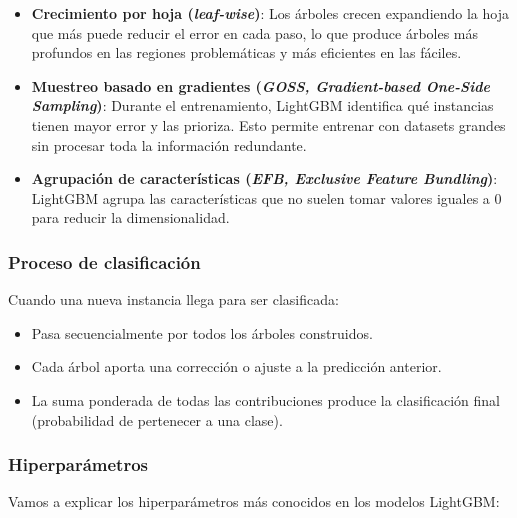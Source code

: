 \begin{itemize}
    \item \textbf{Crecimiento por hoja (\textit{leaf-wise})}: Los árboles crecen expandiendo la hoja que más puede reducir el error en cada paso, lo que produce árboles más profundos en las regiones problemáticas y más eficientes en las fáciles.
    
    \item \textbf{Muestreo basado en gradientes (\textit{GOSS, Gradient-based One-Side Sampling})}: Durante el entrenamiento, LightGBM identifica qué instancias tienen mayor error y las prioriza. Esto permite entrenar con datasets grandes sin procesar toda la información redundante.
    
    \item \textbf{Agrupación de características (\textit{EFB, Exclusive Feature Bundling})}: LightGBM agrupa las características que no suelen tomar valores iguales a 0 para reducir la dimensionalidad.
\end{itemize}

\subsubsection*{Proceso de clasificación}

Cuando una nueva instancia llega para ser clasificada:

\begin{itemize}
    \item Pasa secuencialmente por todos los árboles construidos.
    \item Cada árbol aporta una corrección o ajuste a la predicción anterior.
    \item La suma ponderada de todas las contribuciones produce la clasificación final (probabilidad de pertenecer a una clase).
\end{itemize}

\subsubsection*{Hiperparámetros}

Vamos a explicar los hiperparámetros más conocidos en los modelos LightGBM: 

